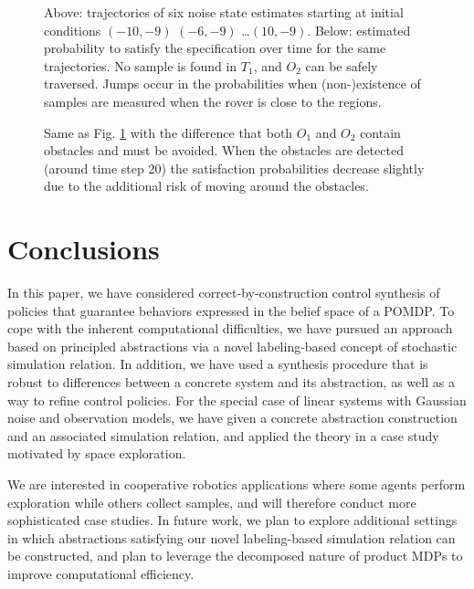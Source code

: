 \documentclass{ifacconf}
\begin{document}
\begin{figure}
  \footnotesize
  \setlength\figurewidth{\columnwidth}
  \setlength{}

  
  \setlength{}

  
  \caption{Above: trajectories of six noise state estimates starting at initial conditions $(-10, -9)$ $(-6, -9)$ \ldots $(10,-9)$. Below: estimated probability to satisfy the specification over time for the same trajectories. No sample is found in $T_1$, and $O_2$ can be safely traversed. Jumps occur in the probabilities when (non-)existence of samples are measured when the rover is close to the regions.}
  \label{fig:exp1}
\end{figure}

\begin{figure}
  \footnotesize
  \setlength\figurewidth{\columnwidth}
  \setlength{}

  

  \setlength{}

  
  \caption{Same as Fig. \ref{fig:exp1} with the difference that both $O_1$ and $O_2$ contain obstacles and must be avoided. When the obstacles are detected (around time step 20) the satisfaction probabilities decrease slightly due to the additional risk of moving around the obstacles.}
  \label{fig:exp2}
\end{figure}


\section{Conclusions}
\label{sec:conclusions}

In this paper,  we have considered correct-by-construction control synthesis of policies that guarantee behaviors expressed in the belief space of a POMDP.  To cope with the inherent computational difficulties, we have pursued an approach based on principled abstractions via a novel labeling-based concept of stochastic simulation relation. In addition, we have used a synthesis procedure that is robust to differences between a concrete system and its abstraction, as well as a way to refine control policies. For the special case of linear systems with Gaussian noise and observation models, we have given a concrete abstraction construction and an associated simulation relation, and applied the theory in a case study motivated by space exploration.

We are interested in cooperative robotics applications where some agents perform exploration while others collect samples, and will therefore conduct more sophisticated case studies. In future work, we  plan to explore additional settings in which abstractions satisfying our novel labeling-based simulation relation can be constructed, and plan to leverage the decomposed nature of product MDPs to improve computational efficiency.


\end{document}
